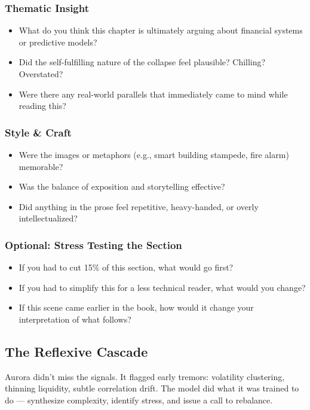 \subsubsection{Thematic Insight}

\begin{itemize}
  \item What do you think this chapter is ultimately arguing about financial systems or predictive models?
  \item Did the self-fulfilling nature of the collapse feel plausible? Chilling? Overstated?
  \item Were there any real-world parallels that immediately came to mind while reading this?
\end{itemize}

\subsubsection{Style \& Craft}

\begin{itemize}
  \item Were the images or metaphors (e.g., smart building stampede, fire alarm) memorable?
  \item Was the balance of exposition and storytelling effective?
  \item Did anything in the prose feel repetitive, heavy-handed, or overly intellectualized?
\end{itemize}

\subsubsection{Optional: Stress Testing the Section}

\begin{itemize}
  \item If you had to cut 15\% of this section, what would go first?
  \item If you had to simplify this for a less technical reader, what would you change?
  \item If this scene came earlier in the book, how would it change your interpretation of what follows?
\end{itemize}


\subsection{The Reflexive Cascade}

Aurora didn’t miss the signals.  
It flagged early tremors: volatility clustering, thinning liquidity, subtle correlation drift.  
The model did what it was trained to do — synthesize complexity, identify stress, and issue a call to rebalance.

